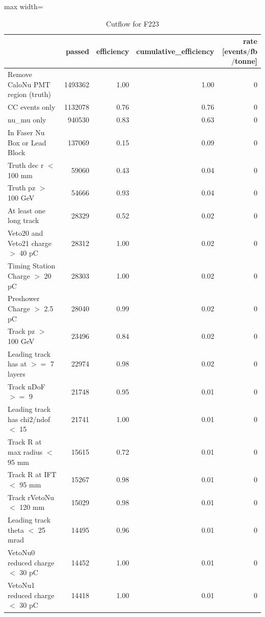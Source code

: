 \documentclass{article}
\begin{document}
\begin{table}
\centering
\caption{Cutflow for F223}
\begin{adjustbox}{max width=\textwidth}
\begin{tabular}{lrrrr}
\toprule
 & passed & efficiency & cumulative\_efficiency & rate [events$/$fb$/$tonne] \\
\midrule
Remove CaloNu PMT region (truth) & 1493362 & 1.00 & 1.00 & 0 \\
CC events only & 1132078 & 0.76 & 0.76 & 0 \\
nu\_mu only & 940530 & 0.83 & 0.63 & 0 \\
In Faser Nu Box or Lead Block & 137069 & 0.15 & 0.09 & 0 \\
Truth dec r $<$ 100 mm & 59060 & 0.43 & 0.04 & 0 \\
Truth pz $>$ 100 GeV & 54666 & 0.93 & 0.04 & 0 \\
At least one long track & 28329 & 0.52 & 0.02 & 0 \\
Veto20 and Veto21 charge $>$ 40 pC & 28312 & 1.00 & 0.02 & 0 \\
Timing Station Charge $>$ 20 pC & 28303 & 1.00 & 0.02 & 0 \\
Preshower Charge $>$ 2.5 pC & 28040 & 0.99 & 0.02 & 0 \\
Track pz $>$ 100 GeV & 23496 & 0.84 & 0.02 & 0 \\
Leading track has at $>$$=$ 7 layers & 22974 & 0.98 & 0.02 & 0 \\
Track nDoF $>$$=$ 9 & 21748 & 0.95 & 0.01 & 0 \\
Leading track has chi2$/$ndof $<$ 15 & 21741 & 1.00 & 0.01 & 0 \\
Track R at max radius $<$ 95 mm & 15615 & 0.72 & 0.01 & 0 \\
Track R at IFT $<$ 95 mm & 15267 & 0.98 & 0.01 & 0 \\
Track rVetoNu $<$ 120 mm & 15029 & 0.98 & 0.01 & 0 \\
Leading track theta $<$ 25 mrad & 14495 & 0.96 & 0.01 & 0 \\
VetoNu0 reduced charge $<$ 30 pC & 14452 & 1.00 & 0.01 & 0 \\
VetoNu1 reduced charge $<$ 30 pC & 14418 & 1.00 & 0.01 & 0 \\
\bottomrule
\end{tabular}

\end{adjustbox}
\end{table}
\end{document}
